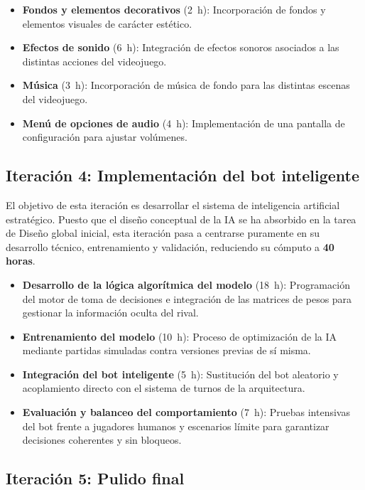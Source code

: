 \begin{itemize}
	\item \textbf{Fondos y elementos decorativos} (2~h): Incorporación de fondos y elementos visuales de carácter estético.
	\item \textbf{Efectos de sonido} (6~h): Integración de efectos sonoros asociados a las distintas acciones del videojuego.
	\item \textbf{Música} (3~h): Incorporación de música de fondo para las distintas escenas del videojuego.
	\item \textbf{Menú de opciones de audio} (4~h): Implementación de una pantalla de configuración para ajustar volúmenes.
\end{itemize}

\subsection{Iteración 4: Implementación del bot inteligente}

El objetivo de esta iteración es desarrollar el sistema de inteligencia artificial estratégico. Puesto que el diseño conceptual de la IA se ha absorbido en la tarea de Diseño global inicial, esta iteración pasa a centrarse puramente en su desarrollo técnico, entrenamiento y validación, reduciendo su cómputo a \textbf{40 horas}.

\begin{itemize}
	\item \textbf{Desarrollo de la lógica algorítmica del modelo} (18~h): Programación del motor de toma de decisiones e integración de las matrices de pesos para gestionar la información oculta del rival.
	\item \textbf{Entrenamiento del modelo} (10~h): Proceso de optimización de la IA mediante partidas simuladas contra versiones previas de sí misma.
	\item \textbf{Integración del bot inteligente} (5~h): Sustitución del bot aleatorio y acoplamiento directo con el sistema de turnos de la arquitectura.
	\item \textbf{Evaluación y balanceo del comportamiento} (7~h): Pruebas intensivas del bot frente a jugadores humanos y escenarios límite para garantizar decisiones coherentes y sin bloqueos.
\end{itemize}

\subsection{Iteración 5: Pulido final}


